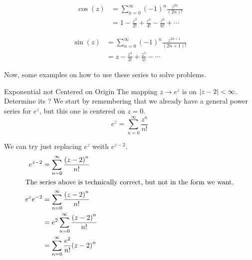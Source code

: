\begin{equation}\label{eq:Complex_Power_Series-cos}
  \begin{aligned}
    \cos(z) &= \sum_{n=0}^{\infty} {(-1)}^{n} \frac{z^{2n}}{(2n)!} \\
    &= 1 - \frac{z^{2}}{2!} + \frac{z^{4}}{4!} - \frac{z^{6}}{6!} + \cdots
  \end{aligned}
\end{equation}

\begin{equation}\label{eq:Complex_Power_Series-sin}
  \begin{aligned}
    \sin(z) &= \sum_{n=0}^{\infty} {(-1)}^{n} \frac{z^{2n+1}}{(2n+1)!} \\
    &= z - \frac{z^{3}}{3!} + \frac{z^{5}}{5!} - \cdots
  \end{aligned}
\end{equation}

Now, some examples on how to use these series to solve problems.
\begin{example}{Exponential not Centered on Origin}
  The mapping $z \to e^{z}$ is  on $\left\lvert z-2 \right\rvert < \infty$.
  Determine its ?
  \tcblower{}
  We start by remembering that we already have a general power series for $e^{z}$, but this one is centered on $z = 0$.
  \begin{equation*}
    e^{z} = \sum_{n=0}^{\infty} \frac{z^{n}}{n!}
  \end{equation*}

  We can try just replacing $e^{z}$ weith $e^{z-2}$.
  \begin{align*}
    e^{z-2} &= \sum_{n=0}^{\infty} \frac{{(z-2)}^{n}}{n!} \\
    \intertext{The series above is technically correct, but not in the form we want.}
    e^{z} e^{-2} &= \sum_{n=0}^{\infty} \frac{{(z-2)}^{n}}{n!} \\
            &= e^{2} \sum_{n=0}^{\infty} \frac{{(z-2)}^{n}}{n!} \\
            &= \sum_{n=0}^{\infty} \frac{e^{2}}{n!} {(z-2)}^{n} \\
  \end{align*}
\end{example}

